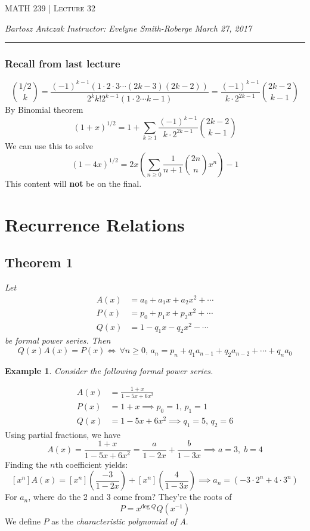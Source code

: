 \documentclass{report}
\newcommand{\lectureNum}{32}
\newcommand{\curDate}{March 27, 2017}
\newcommand{\course}{MATH 239}
\newcommand{\instructor}{Evelyne Smith-Roberge}
\newtheorem{ex}{Example}[section]
\begin{document}
\begin{center}
\begin{Large}
\textsc{\course{} | Lecture \lectureNum{}}
\end{Large}
\end{center} 
\noindent \textit{Bartosz Antczak} \hfill
\textit{Instructor: \instructor{}} \hfill
\textit{\curDate{}}
\rule{\textwidth}{0.4pt}
\onehalfspacing
\subsubsection{Recall from last lecture}
$${1/2 \choose k} = \frac{(-1)^{k-1}(1\cdot 2 \cdot 3 \cdots (2k-3)(2k-2))}{2^kk!2^{k-1}(1\cdot 2\cdots k-1)} = \frac{(-1)^{k-1}}{k \cdot 2^{2k-1}}{2k-2 \choose k-1}$$
By Binomial theorem
$$(1+x)^{1/2} = 1 + \sum_{k \geq 1}\frac{(-1)^{k-1}}{k \cdot 2^{2k-1}}{2k-2 \choose k-1}$$
We can use this to solve
$$(1-4x)^{1/2} = 2x \left( \sum_{n \geq 0}\frac{1}{n+1}{2n \choose n}x^n\right)-1$$
This content will \textbf{not} be on the final.
\section{Recurrence Relations}
\subsection{Theorem 1}
\textit{Let}
\begin{align*}
A(x) &= a_0 + a_1x + a_2x^2 + \cdots \\
P(x) &= p_0 + p_1x + p_2x^2 + \cdots \\
Q(x) &= 1 - q_1x - q_2x^2 - \cdots
\end{align*}
\textit{be formal power series. Then}
$$Q(x)A(x) = P(x) \iff  \,\forall n \geq 0,\, a_n = p_n + q_1a_{n-1} + q_2a_{n-2} + \cdots + q_na_0$$
\begin{ex}
Consider the following formal power series.
\end{ex}
\begin{align*}
A(x) &= \frac{1+x}{1-5x+6x^2} \\
P(x) &= 1 + x \implies p_0 = 1, \, p_1 = 1 \\
Q(x) &= 1 - 5x + 6x^2 \implies q_1 = 5, \, q_2 = 6
\end{align*}
Using partial fractions, we have
$$A(x) = \frac{1+x}{1-5x+6x^2} = \frac{a}{1-2x} + \frac{b}{1-3x} \implies a = 3,\; b = 4$$
Finding the $n$th coefficient yields:
$$[x^n]A(x) = [x^n]\left( \frac{-3}{1-2x}\right) + [x^n]\left(\frac{4}{1-3x} \right) \implies a_n = (-3 \cdot 2^n + 4 \cdot 3^n)$$
For $a_n$, where do the 2 and 3 come from? They're the roots of
$$P = x^{\mathrm{deg}\; Q}Q(x^{-1})$$
We define $P$ as the \textit{characteristic polynomial of A}.
\end{document}
